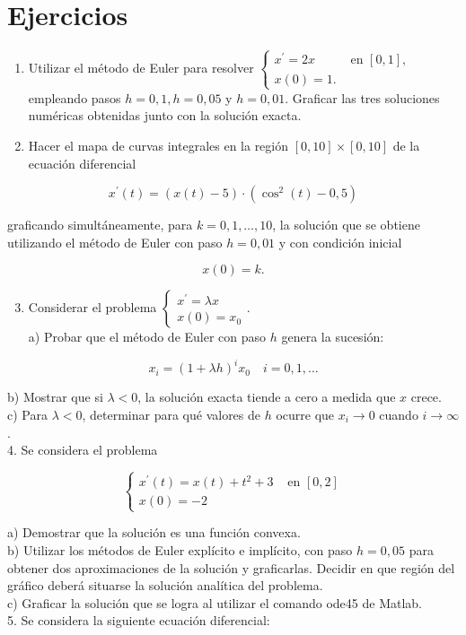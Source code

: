 \documentclass[10pt]{book}
\begin{document}
\section{Ejercicios}
\begin{enumerate}
  \item Utilizar el método de Euler para resolver $\begin{cases}x^{\prime}=2 x & \text { en }[0,1], \\ x(0)=1 . & \end{cases}$ empleando pasos $h=0,1, h=0,05$ y $h=0,01$. Graficar las tres soluciones numéricas obtenidas junto con la solución exacta.
  \item Hacer el mapa de curvas integrales en la región $[0,10] \times[0,10]$ de la ecuación diferencial
\end{enumerate}

$$
x^{\prime}(t)=(x(t)-5) \cdot\left(\cos ^{2}(t)-0,5\right)
$$

graficando simultáneamente, para $k=0,1, \ldots, 10$, la solución que se obtiene utilizando el método de Euler con paso $h=0,01$ y con condición inicial

$$
x(0)=k .
$$

\begin{enumerate}
  \setcounter{enumi}{2}
  \item Considerar el problema $\left\{\begin{array}{l}x^{\prime}=\lambda x \\ x(0)=x_{0}\end{array}\right.$.\\
a) Probar que el método de Euler con paso $h$ genera la sucesión:
\end{enumerate}

$$
x_{i}=(1+\lambda h)^{i} x_{0} \quad i=0,1, \ldots
$$

b) Mostrar que si $\lambda<0$, la solución exacta tiende a cero a medida que $x$ crece.\\
c) Para $\lambda<0$, determinar para qué valores de $h$ ocurre que $x_{i} \rightarrow 0$ cuando $i \rightarrow \infty$.\\
4. Se considera el problema

$$
\begin{cases}x^{\prime}(t)=x(t)+t^{2}+3 & \text { en }[0,2] \\ x(0)=-2 & \end{cases}
$$

a) Demostrar que la solución es una función convexa.\\
b) Utilizar los métodos de Euler explícito e implícito, con paso $h=0,05$ para obtener dos aproximaciones de la solución y graficarlas. Decidir en que región del gráfico deberá situarse la solución analítica del problema.\\
c) Graficar la solución que se logra al utilizar el comando ode45 de Matlab.\\
5. Se considera la siguiente ecuación diferencial:
\end{document}
